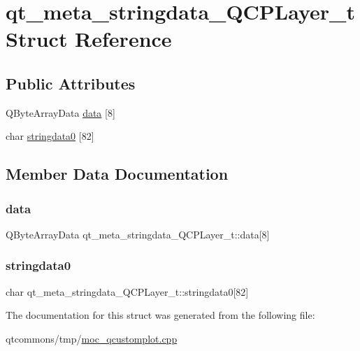\hypertarget{structqt__meta__stringdata___q_c_p_layer__t}{}\section{qt\+\_\+meta\+\_\+stringdata\+\_\+\+Q\+C\+P\+Layer\+\_\+t Struct Reference}
\label{structqt__meta__stringdata___q_c_p_layer__t}
\subsection*{Public Attributes}
\begin{DoxyCompactItemize}
\item 
Q\+Byte\+Array\+Data \mbox{\hyperlink{structqt__meta__stringdata___q_c_p_layer__t_a046dd79d7a9d29beb24810f55b78f692}{data}} \mbox{[}8\mbox{]}
\item 
char \mbox{\hyperlink{structqt__meta__stringdata___q_c_p_layer__t_ab0e5173a2211360bd9c73b16556a514f}{stringdata0}} \mbox{[}82\mbox{]}
\end{DoxyCompactItemize}


\subsection{Member Data Documentation}
\mbox{\label{structqt__meta__stringdata___q_c_p_layer__t_a046dd79d7a9d29beb24810f55b78f692}} 
\subsubsection{\texorpdfstring{data}{data}}
{\footnotesize\ttfamily Q\+Byte\+Array\+Data qt\+\_\+meta\+\_\+stringdata\+\_\+\+Q\+C\+P\+Layer\+\_\+t\+::data\mbox{[}8\mbox{]}}

\mbox{\label{structqt__meta__stringdata___q_c_p_layer__t_ab0e5173a2211360bd9c73b16556a514f}} 
\subsubsection{\texorpdfstring{stringdata0}{stringdata0}}
{\footnotesize\ttfamily char qt\+\_\+meta\+\_\+stringdata\+\_\+\+Q\+C\+P\+Layer\+\_\+t\+::stringdata0\mbox{[}82\mbox{]}}



The documentation for this struct was generated from the following file\+:\begin{DoxyCompactItemize}
\item 
qtcommons/tmp/\mbox{\hyperlink{moc__qcustomplot_8cpp}{moc\+\_\+qcustomplot.\+cpp}}\end{DoxyCompactItemize}
